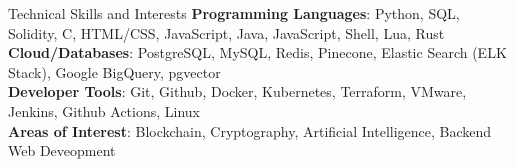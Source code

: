 \documentclass{resume} %
\begin{document}

\begin{rSection}{Technical Skills and Interests}
	\textbf{Programming Languages}{: Python, SQL, Solidity, C, HTML/CSS, JavaScript, Java, JavaScript, Shell, Lua, Rust} \\
	\textbf{Cloud/Databases}{: PostgreSQL, MySQL, Redis, Pinecone, Elastic Search (ELK Stack), Google BigQuery, pgvector} \\
	\textbf{Developer Tools}{: Git, Github, Docker, Kubernetes, Terraform, VMware, Jenkins, Github Actions, Linux} \\
	\textbf{Areas of Interest}{: Blockchain, Cryptography, Artificial Intelligence, Backend Web Deveopment}
\end{rSection}
\end{document}
